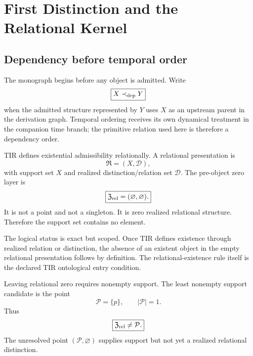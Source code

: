 
\chapter{First Distinction and the Relational Kernel}
\label{ch:v12_first_distinction}

\section{Dependency before temporal order}

The monograph begins before any object is admitted. Write
\begin{equation}
\boxed{X\prec_{\rm dep}Y}
\end{equation}
when the admitted structure represented by $Y$ uses $X$ as an upstream parent in the derivation graph. Temporal ordering receives its own dynamical treatment in the companion time branch; the primitive relation used here is therefore a dependency order.

TIR defines existential admissibility relationally. A relational presentation is
\begin{equation}
\mathfrak R=(X,\mathcal D),
\end{equation}
with support set $X$ and realized distinction/relation set $\mathcal D$. The pre-object zero layer is
\begin{equation}
\boxed{
\mathfrak Z_{\rm rel}=(\varnothing,\varnothing).
}
\label{eq:v12_relational_zero}
\end{equation}
It is not a point and not a singleton. It is zero realized relational structure. Therefore the support set contains no element.

The logical status is exact but scoped. Once TIR defines existence through realized relation or distinction, the absence of an existent object in the empty relational presentation follows by definition. The relational-existence rule itself is the declared TIR ontological entry condition.

Leaving relational zero requires nonempty support. The least nonempty support candidate is the point
\begin{equation}
\boxed{
\mathcal P=\{p\},
\qquad
|\mathcal P|=1.
}
\label{eq:v12_minimal_point_support}
\end{equation}
Thus
\begin{equation}
\boxed{
\mathfrak Z_{\rm rel}\neq\mathcal P.
}
\end{equation}
The unresolved point $(\mathcal P,\varnothing)$ supplies support but not yet a realized relational distinction.

